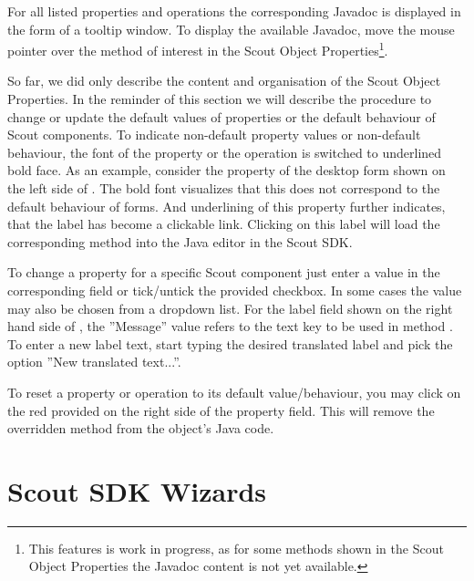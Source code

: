 \documentclass[a4paper,10pt,twoside]{book}
\begin{document}
For all listed properties and operations the corresponding Javadoc is displayed in the form of a tooltip window. 
To display the available Javadoc, move the mouse pointer over the method of interest in the Scout Object Properties\footnote{
This features is work in progress, as for some methods shown in the Scout Object Properties the Javadoc content is not yet available. 
}. 


So far, we did only describe the content and organisation of the Scout Object Properties. 
In the reminder of this section we will describe the procedure to change or update the default values of properties or the default behaviour of Scout components. 
To indicate non-default property values or non-default behaviour, the font of the property or the operation is switched to underlined bold face. 
As an example, consider the property  of the desktop form shown on the left side of . 
The bold font visualizes that this does not correspond to the default behaviour of forms. 
And underlining of this property further indicates, that the label has become a clickable link. 
Clicking on this label will load the corresponding method into the Java editor in the Scout SDK. 

To change a property for a specific Scout component just enter a value in the corresponding field or tick/untick the provided checkbox. 
In some cases the value may also be chosen from a dropdown list. 
For the label field shown on the right hand side of , the ''Message'' value refers to the text key to be used in method . 
To enter a new label text, start typing the desired translated label and pick the option ''New translated text...''. 

To reset a property or operation to its default value/behaviour, you may click on the red  provided on the right side of the property field. 
This will remove the overridden method from the object's Java code. 

\section{Scout SDK Wizards}
\end{document}
